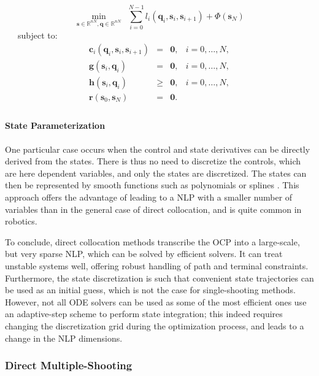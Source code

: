 \begin{equation}
  \min_{\mathbf{s}\in\mathbb R^{nN},\mathbf{q}\in\mathbb R^{nN}} \ \ \sum_{i=0}^{N-1}l_i(\mathbf{q}_i,\mathbf{s}_i,\mathbf{s}_{i+1}) + \Phi(\mathbf{s}_N)
\end{equation}
\ \ \ subject to:
\begin{equation}
  \begin{array}{rclr}
    \mathbf{c}_i(\mathbf{q}_i,\mathbf{s}_i,\mathbf{s}_{i+1}) & = & \mathbf{0}, & i=0,\ldots,N,%
    \\
    \mathbf{g}(\mathbf{s}_i,\mathbf{q}_i) & = & \mathbf{0}, & i=0,\ldots,N,%
    \\%
    \mathbf{h}(\mathbf{s}_i,\mathbf{q}_i) & \ge & \mathbf{0}, & i=0,\ldots,N,%
    \\%
    \mathbf{r} (\mathbf{s}_0, \mathbf{s}_N) & = & \mathbf{0}.%
    \\%
  \end{array}
\end{equation} 

\paragraph{State Parameterization}
One particular case occurs when the control and state derivatives can
be directly derived from the states. There is thus no need to
discretize the controls, which are here dependent variables, and only
the states are discretized. The states can then be represented by
smooth functions such as polynomials or splines
\cite{sirinesa1981}. This approach offers the advantage of leading to
a NLP with a smaller number of variables than in the general case of
direct collocation, and is quite common in robotics.

To conclude, direct collocation methods transcribe the OCP into a
large-scale, but very sparse NLP, which can be solved by efficient
solvers. It can treat unstable systems well, offering robust handling
of path and terminal constraints. Furthermore, the state
discretization is such that convenient state trajectories can be used
as an initial guess, which is not the case for single-shooting
methods. However, not all ODE solvers can be used as some of the most
efficient ones use an adaptive-step scheme to perform state
integration; this indeed requires changing the discretization grid
during the optimization process, and leads to a change in the NLP
dimensions.

\subsubsection{Direct Multiple-Shooting}
\label{subsubsec:chap3-direct-multiple-shooting}

